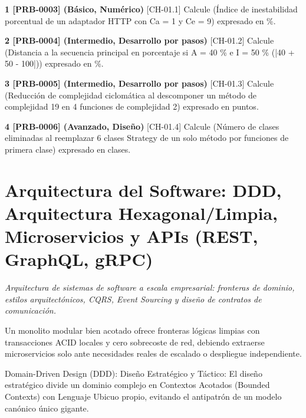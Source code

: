 \documentclass{book}
\begin{document}
\begin{tcolorbox}[title={Ejercicios}, studiumworked, breakable]

\noindent\textbf{1 [PRB-0003] (Básico, Numérico)}
[CH-01.1] Calcule (Índice de inestabilidad porcentual de un adaptador HTTP con Ca = 1 y Ce = 9) expresado en \%.

\noindent\textbf{2 [PRB-0004] (Intermedio, Desarrollo por pasos)}
[CH-01.2] Calcule (Distancia a la secuencia principal en porcentaje si A = 40 \% e I = 50 \% (|40 + 50 - 100|)) expresado en \%.

\noindent\textbf{3 [PRB-0005] (Intermedio, Desarrollo por pasos)}
[CH-01.3] Calcule (Reducción de complejidad ciclomática al descomponer un método de complejidad 19 en 4 funciones de complejidad 2) expresado en puntos.

\noindent\textbf{4 [PRB-0006] (Avanzado, Diseño)}
[CH-01.4] Calcule (Número de clases eliminadas al reemplazar 6 clases Strategy de un solo método por funciones de primera clase) expresado en clases.
\end{tcolorbox}

\chapter{Arquitectura del Software: DDD, Arquitectura Hexagonal/Limpia, Microservicios y APIs (REST, GraphQL, gRPC)}
\label{chap:ch-02}

\noindent\textit{Arquitectura de sistemas de software a escala empresarial: fronteras de dominio, estilos arquitectónicos, CQRS, Event Sourcing y diseño de contratos de comunicación.}

\begin{tcolorbox}[title={Consejo}, studiumtip, breakable]

Un monolito modular bien acotado ofrece fronteras lógicas limpias con transacciones ACID locales y cero sobrecoste de red, debiendo extraerse microservicios solo ante necesidades reales de escalado o despliegue independiente.
\end{tcolorbox}

\begin{tcolorbox}[title={Definición}, studiumdef, breakable]

Domain-Driven Design (DDD): Diseño Estratégico y Táctico: El diseño estratégico divide un dominio complejo en Contextos Acotados (Bounded Contexts) con Lenguaje Ubicuo propio, evitando el antipatrón de un modelo canónico único gigante.
\end{tcolorbox}
\end{document}

